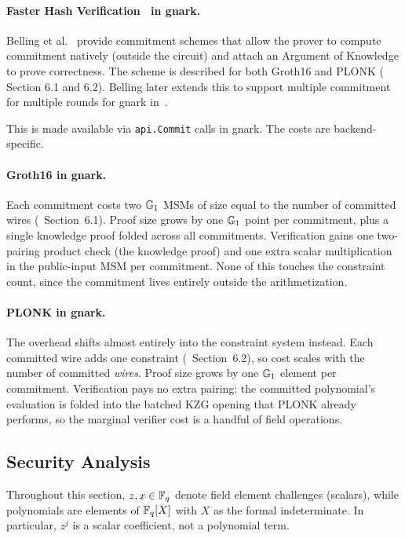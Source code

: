 \paragraph{Faster Hash Verification~\cite{FstHV} in gnark.} \label{sec:iop:fs:gnark}
Belling et al.~\cite{FstHV} provide commitment schemes that allow the prover to compute commitment natively (outside the circuit) and attach an Argument of Knowledge to prove correctness. The scheme is described for both Groth16 and PLONK (\cite{FstHV} Section 6.1 and 6.2). Belling later extends this to support multiple commitment for multiple rounds for gnark in~\cite{mrmc}.

This is made available via \texttt{api.Commit} calls in gnark. The costs are backend-specific.

\paragraph{Groth16 in gnark.} Each commitment costs two $\mathbb{G}_1$ MSMs of size equal to the number of committed wires (\cite{FstHV}~Section~6.1). Proof size grows by one $\mathbb{G}_1$ point per commitment, plus a single knowledge proof folded across all commitments. Verification gains one two-pairing product check (the knowledge proof) and one extra scalar multiplication in the public-input MSM per commitment. None of this touches the constraint count, since the commitment lives entirely outside the arithmetization.

\paragraph{PLONK in gnark.} The overhead shifts almost entirely into the constraint system instead. Each committed wire adds one constraint (\cite{FstHV}~Section~6.2), so cost scales with the number of committed \emph{wires}. Proof size grows by one $\mathbb{G}_1$ element per commitment. Verification pays no extra pairing: the committed polynomial's evaluation is folded into the batched KZG opening that PLONK already performs, so the marginal verifier cost is a handful of field operations.

\subsection{Security Analysis}

Throughout this section, $z, x \in \mathbb{F}_q$ denote field element challenges (scalars),
while polynomials are elements of $\mathbb{F}_q[X]$ with $X$ as the formal indeterminate.
In particular, $z^j$ is a scalar coefficient, not a polynomial term.

